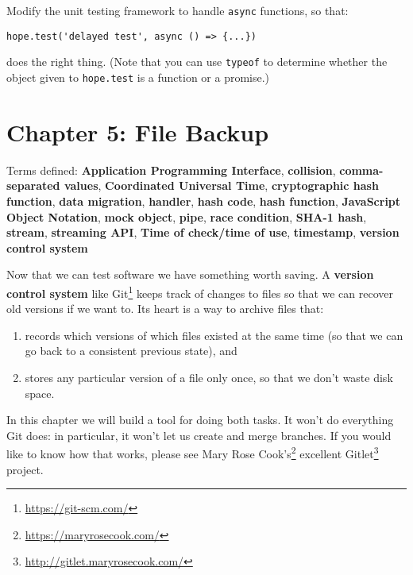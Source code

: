 \documentclass[krantzl]{krantz}
\newcommand{\glossref}[1]{\textbf{#1}}
\newcommand{\hreffoot}[2]{{#1}\footnote{\href{#2}{#2}}}
\begin{document}
Modify the unit testing framework to handle \texttt{async} functions,
so that:

\begin{lstlisting}[frame=single,frameround=tttt]
hope.test('delayed test', async () => {...})
\end{lstlisting}


\noindent does the right thing.
(Note that you can use \texttt{typeof} to determine whether the object given to \texttt{hope.test}
is a function or a promise.)

\chapter{Chapter 5: File Backup}\label{file-backup}


\noindent 
    Terms defined:
    \glossref{Application Programming Interface}, \glossref{collision}, \glossref{comma-separated values}, \glossref{Coordinated Universal Time}, \glossref{cryptographic hash function}, \glossref{data migration}, \glossref{handler}, \glossref{hash code}, \glossref{hash function}, \glossref{JavaScript Object Notation}, \glossref{mock object}, \glossref{pipe}, \glossref{race condition}, \glossref{SHA-1 hash}, \glossref{stream}, \glossref{streaming API}, \glossref{Time of check/time of use}, \glossref{timestamp}, \glossref{version control system}



Now that we can test software we have something worth saving.
A \glossref{version control system}
like \hreffoot{Git}{https://git-scm.com/}
keeps track of changes to files
so that we can recover old versions if we want to.
Its heart is a way to archive files that:

\begin{enumerate}

\item records which versions of which files existed at the same time
    (so that we can go back to a consistent previous state), and

\item stores any particular version of a file only once,
    so that we don't waste disk space.

\end{enumerate}


In this chapter we will build a tool for doing both tasks.
It won't do everything Git does:
in particular, it won't let us create and merge branches.
If you would like to know how that works,
please see \hreffoot{Mary Rose Cook's}{https://maryrosecook.com/} excellent \hreffoot{Gitlet}{http://gitlet.maryrosecook.com/} project.
\end{document}
